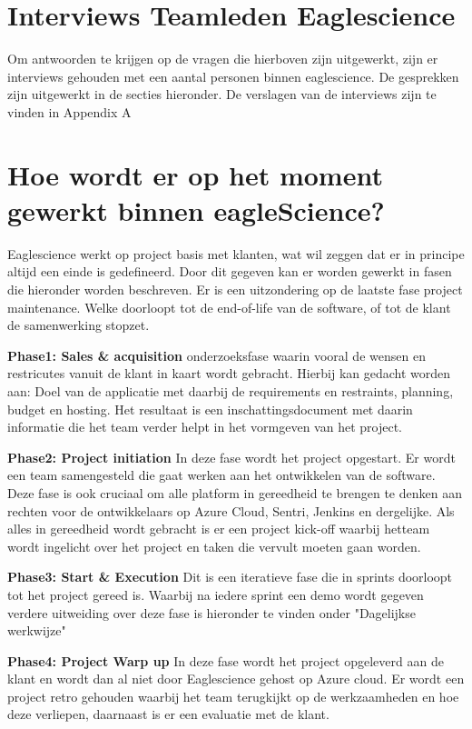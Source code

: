 \section{Interviews Teamleden Eaglescience}\label{sec:interviews-teamleden-eaglescience}
Om antwoorden te krijgen op de vragen die hierboven zijn uitgewerkt, zijn er interviews gehouden met een aantal personen binnen eaglescience.
De gesprekken zijn uitgewerkt in de secties hieronder.
De verslagen van de interviews zijn te vinden in Appendix A

\section{Hoe wordt er op het moment gewerkt binnen eagleScience?}\label{sec:hoe-wordt-er-op-het-moment-gewerkt-binnen-eaglescience?}
Eaglescience werkt op project basis met klanten, wat wil zeggen dat er in principe altijd een einde is gedefineerd.
Door dit gegeven kan er worden gewerkt in fasen die hieronder worden beschreven.
Er is een uitzondering op de laatste fase project maintenance.
Welke doorloopt tot de end-of-life van de software, of tot de klant de samenwerking stopzet.

\textbf{Phase1: Sales \& acquisition}
onderzoeksfase waarin vooral de wensen en restricutes vanuit de klant in kaart wordt gebracht.
Hierbij kan gedacht worden aan: Doel van de applicatie met daarbij de requirements en restraints, planning, budget en hosting.
Het resultaat is een inschattingsdocument met daarin informatie die het team verder helpt in het vormgeven van het project.

\textbf{Phase2: Project initiation}
In deze fase wordt het project opgestart.
Er wordt een team samengesteld die gaat werken aan het ontwikkelen van de software.
Deze fase is ook cruciaal om alle platform in gereedheid te brengen te denken aan rechten voor de ontwikkelaars op Azure Cloud, Sentri, Jenkins en dergelijke.
Als alles in gereedheid wordt gebracht is er een project kick-off waarbij hetteam wordt ingelicht over het project en taken die vervult moeten gaan worden.

\textbf{Phase3: Start \& Execution}
Dit is een iteratieve fase die in sprints doorloopt tot het project gereed is.
Waarbij na iedere sprint een demo wordt gegeven verdere uitweiding over deze fase is hieronder te vinden onder "Dagelijkse werkwijze"

\textbf{Phase4: Project Warp up}
In deze fase wordt het project opgeleverd aan de klant en wordt dan al niet door Eaglescience gehost op Azure cloud.
Er wordt een project retro gehouden waarbij het team terugkijkt op de werkzaamheden en hoe deze verliepen, daarnaast is er een evaluatie met de klant.

